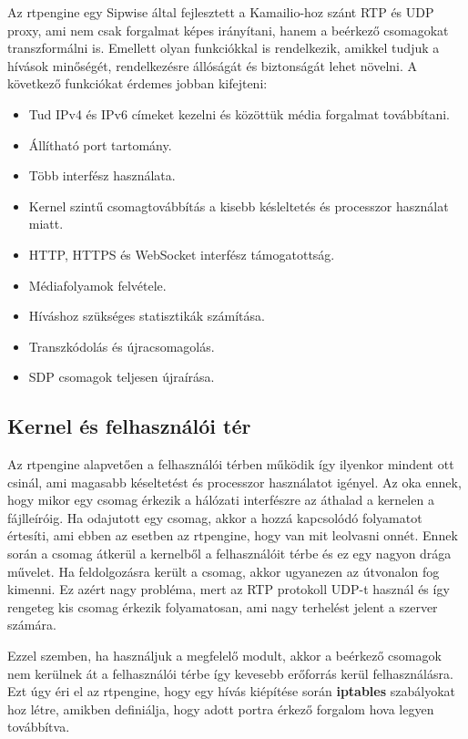 Az rtpengine egy Sipwise  által fejlesztett a Kamailio-hoz szánt RTP és UDP 
proxy, ami nem csak forgalmat képes irányítani, hanem a beérkező csomagokat transzformálni is.
Emellett olyan funkciókkal is rendelkezik, amikkel tudjuk a hívások minőségét, 
rendelkezésre állóságát és biztonságát lehet növelni. A következő funkciókat érdemes 
jobban kifejteni: 

\begin{itemize}
	\item Tud IPv4 és IPv6 címeket kezelni és közöttük média forgalmat továbbítani. 
	\item Állítható port tartomány. 
	\item Több interfész használata. 
	\item Kernel szintű csomagtovábbítás a kisebb késleltetés és processzor használat miatt.
	\item HTTP, HTTPS és WebSocket interfész támogatottság.
	\item Médiafolyamok felvétele. 
	\item Híváshoz szükséges statisztikák számítása.
	\item Transzkódolás és újracsomagolás.
	\item SDP csomagok teljesen újraírása. 
\end{itemize}

\subsection{Kernel és felhasználói tér}

Az rtpengine alapvetően a felhasználói térben működik így ilyenkor mindent ott csinál, ami
magasabb késeltetést és processzor használatot igényel. Az oka ennek, hogy mikor egy csomag
érkezik a hálózati interfészre az áthalad a kernelen a fájlleíróig. Ha odajutott egy 
csomag, akkor a hozzá kapcsolódó folyamatot értesíti, ami ebben az esetben az rtpengine, hogy
van mit leolvasni onnét. Ennek során a csomag átkerül a kernelből a felhasználóit térbe és 
ez egy nagyon drága művelet. Ha feldolgozásra került a csomag, akkor ugyanezen az útvonalon
fog kimenni. Ez azért nagy probléma, mert az RTP protokoll UDP-t használ és így rengeteg 
kis csomag érkezik folyamatosan, ami nagy terhelést jelent a szerver számára. 

Ezzel szemben, ha használjuk a megfelelő modult, akkor a beérkező csomagok nem kerülnek át a 
felhasználói térbe így kevesebb erőforrás kerül felhasználásra. Ezt úgy éri el az rtpengine,
hogy egy hívás kiépítése során \textbf{iptables} szabályokat hoz létre, amikben definiálja, hogy
adott portra érkező forgalom hova legyen továbbítva. 

